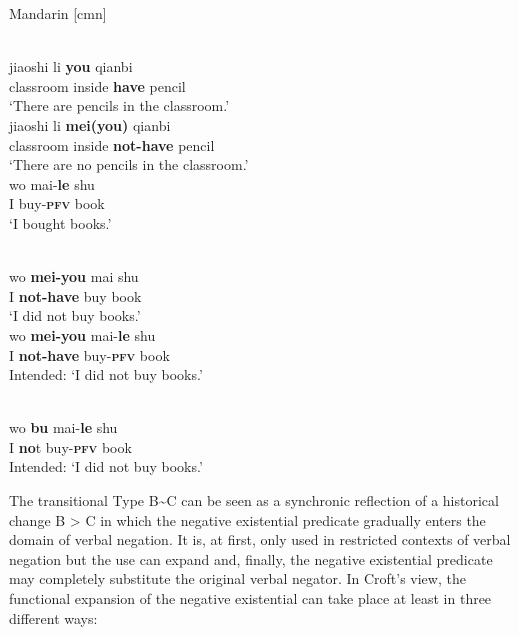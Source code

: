\documentclass[output=paper,chinesefont,colorlinks,citecolor=brown]{langscibook}
\begin{document}
\begin{exe}
\ex Mandarin [cmn]  \label{ex:mandarin1}
\begin{xlist}
\label{ex:mandarin1a}\\
\gll jiaoshi li \textbf{you} qianbi\\ 
 classroom	inside \textbf{have} pencil\\
 \glt `There are pencils in the classroom.'
\label{ex:mandarin1b}\\
\gll jiaoshi li \textbf{mei(you)} qianbi\\
 classroom inside \textbf{not-have} pencil\\
 \glt `There are no pencils in the classroom.'
\label{ex:mandarin1c}\\
\gll wo	mai-\textbf{le} shu \\
I buy-\textbf{\textsc{pfv}} book\\
\glt `I bought books.'
 
\label{ex:mandarin1d}\\
\gll wo	\textbf{mei-you} mai shu \\
I \textbf{not-have} buy book\\
\glt `I did not buy books.'
\label{ex:mandarin1e}\\
\gll *wo \textbf{mei-you} mai-\textbf{le} shu\\
 I \textbf{not-have} buy-\textbf{\textsc{pfv}} book\\
\glt Intended: `I did not buy books.'

\label{ex:mandarin1f}\\
\gll *wo \textbf{bu} mai-\textbf{le} shu \\
I \textbf{no}t buy-\textbf{\textsc{pfv}} book\\
\glt Intended: `I did not buy books.'

\end{xlist}
\end{exe}
The transitional Type B{\textasciitilde}C can be seen as a synchronic reflection of a historical change B > C in which the negative existential predicate gradually enters the domain of verbal negation. It is, at first, only used in restricted contexts of verbal negation but the use can expand and, finally, the negative existential predicate may completely substitute the original verbal negator. In Croft’s view, the functional expansion of the negative existential can take place at least in three different ways:
\end{document}
